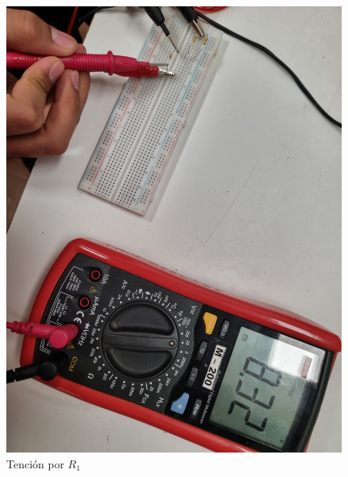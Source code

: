 \documentclass[a4paper,12pt]{article}
\begin{document}
\begin{figure}[H]
    \centering
    \begin{minipage}{0.40\textwidth}
        \centering
        \includegraphics[width=\linewidth]{imagenes/tensioni1.jpg}
        \caption*{Tención por $R_1$}
    \end{minipage}
    \hfill
    \begin{minipage}{0.40\textwidth}
        \centering

\end{minipage}
\end{figure}
\end{document}
